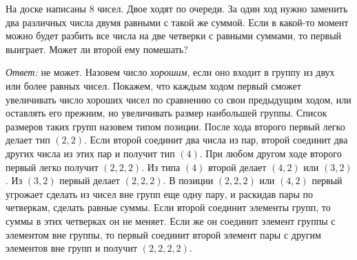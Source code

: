 \problem
На доске написаны $8$ чисел.
Двое ходят по очереди.
За один ход нужно заменить два различных числа двумя равными с такой же суммой.
Если в какой-то момент можно будет разбить все числа на две четверки с равными
суммами, то первый выиграет.
Может ли второй ему помешать?

\solution
\emph{Ответ:} не может.
Назовем число \emph{хорошим}, если оно входит в группу из двух или более равных
чисел.
Покажем, что каждым ходом первый сможет увеличивать число хороших чисел по
сравнению со свои предыдущим ходом, или оставлять его прежним, но увеличивать
размер наибольшей группы.
Список размеров таких групп назовем типом позиции.
После хода второго первый легко делает тип $(2, 2)$.
Если второй соединит два числа из пар, второй соединит два других числа из этих
пар и получит тип $(4)$.
При любом другом ходе второго первый легко получит $(2, 2, 2)$.
Из типа $(4)$ второй делает $(4, 2)$ или $(3, 2)$.
Из $(3, 2)$ первый делает $(2, 2, 2)$.
В позиции $(2, 2, 2)$ или $(4, 2)$ первый угрожает сделать из чисел вне групп
еще одну пару, и раскидав пары по четверкам, сделать равные суммы.
Если второй соединит элементы групп, то суммы в этих четверках он не меняет.
Если же он соединит элемент группы с элементом вне группы, то первый соединит
второй элемент пары с другим элементов вне групп и получит $(2, 2, 2, 2)$.

\endproblem
